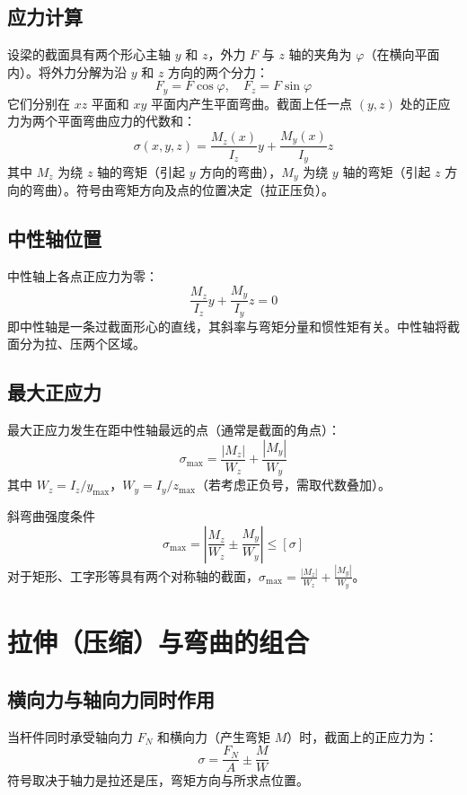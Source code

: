 \subsection{应力计算}
设梁的截面具有两个形心主轴 \(y\) 和 \(z\)，外力 \(F\) 与 \(z\) 轴的夹角为 \(\varphi\)（在横向平面内）。将外力分解为沿 \(y\) 和 \(z\) 方向的两个分力：
\[
F_y = F \cos\varphi,\quad F_z = F \sin\varphi
\]
它们分别在 \(xz\) 平面和 \(xy\) 平面内产生平面弯曲。截面上任一点 \((y,z)\) 处的正应力为两个平面弯曲应力的代数和：
\[
\sigma(x,y,z) = \frac{M_z(x)}{I_z} y + \frac{M_y(x)}{I_y} z
\]
其中 \(M_z\) 为绕 \(z\) 轴的弯矩（引起 \(y\) 方向的弯曲），\(M_y\) 为绕 \(y\) 轴的弯矩（引起 \(z\) 方向的弯曲）。符号由弯矩方向及点的位置决定（拉正压负）。

\subsection{中性轴位置}
中性轴上各点正应力为零：
\[
\frac{M_z}{I_z} y + \frac{M_y}{I_y} z = 0
\]
即中性轴是一条过截面形心的直线，其斜率与弯矩分量和惯性矩有关。中性轴将截面分为拉、压两个区域。

\subsection{最大正应力}
最大正应力发生在距中性轴最远的点（通常是截面的角点）：
\[
\sigma_{\max} = \frac{|M_z|}{W_z} + \frac{|M_y|}{W_y}
\]
其中 \(W_z = I_z / y_{\max}\)，\(W_y = I_y / z_{\max}\)（若考虑正负号，需取代数叠加）。

\begin{myTheorem}{斜弯曲强度条件}
    \[
    \sigma_{\max} = \left| \frac{M_z}{W_z} \pm \frac{M_y}{W_y} \right| \le [\sigma]
    \]
    对于矩形、工字形等具有两个对称轴的截面，\(\sigma_{\max} = \frac{|M_z|}{W_z} + \frac{|M_y|}{W_y}\)。
\end{myTheorem}

\section{拉伸（压缩）与弯曲的组合}

\subsection{横向力与轴向力同时作用}
当杆件同时承受轴向力 \(F_N\) 和横向力（产生弯矩 \(M\)）时，截面上的正应力为：
\[
\sigma = \frac{F_N}{A} \pm \frac{M}{W}
\]
符号取决于轴力是拉还是压，弯矩方向与所求点位置。

